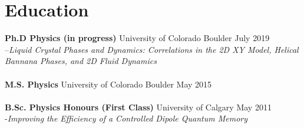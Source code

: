 \documentclass[11.5pt, a4paper]{article}
\begin{document}
\section*{Education}          
\vspace{-.1in}
   \noindent \textbf{Ph.D Physics (in progress)}  University of Colorado Boulder \dotfill July 2019  \\        
    \indent --{\itshape Liquid Crystal Phases and Dynamics: Correlations in the
    2D XY Model, Helical Bannana Phases, and 2D Fluid Dynamics} \\
    \vspace{-0.75em}
    \phantom{.}\\
\noindent\textbf{M.S. Physics} University of Colorado Boulder \dotfill  May 2015
\\
\vspace{-0.75em}
    \phantom{.}\\

\noindent\textbf{B.Sc. Physics Honours (First Class)} University of Calgary \dotfill May 2011   \\       
\indent -{\itshape Improving the Efficiency of a Controlled Dipole Quantum
    Memory}\\

 
\vspace{-0.2in}	
\end{document}
